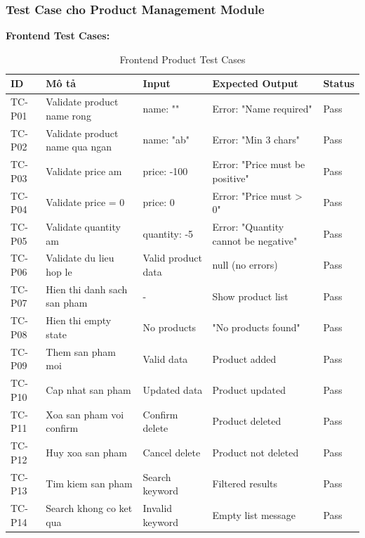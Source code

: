 \subsubsection{Test Case cho Product Management Module}
\textbf{Frontend Test Cases:}
\begin{table}[H]
\centering
\small
\begin{tabular}{|p{1cm}|p{3.5cm}|p{3cm}|p{3.5cm}|p{1.5cm}|}
\hline
\textbf{ID} & \textbf{Mô tả} & \textbf{Input} & \textbf{Expected Output} & \textbf{Status} \\
\hline
TC-P01 & Validate product name rong & name: "" & Error: "Name required" & Pass \\
\hline
TC-P02 & Validate product name qua ngan & name: "ab" & Error: "Min 3 chars" & Pass \\
\hline
TC-P03 & Validate price am & price: -100 & Error: "Price must be positive" & Pass \\
\hline
TC-P04 & Validate price = 0 & price: 0 & Error: "Price must > 0" & Pass \\
\hline
TC-P05 & Validate quantity am & quantity: -5 & Error: "Quantity cannot be negative" & Pass \\
\hline
TC-P06 & Validate du lieu hop le & Valid product data & null (no errors) & Pass \\
\hline
TC-P07 & Hien thi danh sach san pham & - & Show product list & Pass \\
\hline
TC-P08 & Hien thi empty state & No products & "No products found" & Pass \\
\hline
TC-P09 & Them san pham moi & Valid data & Product added & Pass \\
\hline
TC-P10 & Cap nhat san pham & Updated data & Product updated & Pass \\
\hline
TC-P11 & Xoa san pham voi confirm & Confirm delete & Product deleted & Pass \\
\hline
TC-P12 & Huy xoa san pham & Cancel delete & Product not deleted & Pass \\
\hline
TC-P13 & Tim kiem san pham & Search keyword & Filtered results & Pass \\
\hline
TC-P14 & Search khong co ket qua & Invalid keyword & Empty list message & Pass \\
\hline
\end{tabular}
\caption{Frontend Product Test Cases}
\end{table}

